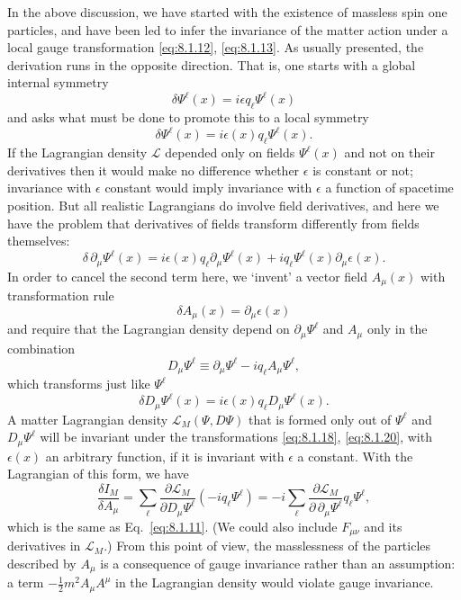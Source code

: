 In the above discussion, we have started with the existence of massless
spin one particles, and have been led to infer the invariance of the matter
action under a local gauge transformation \eqref{eq:8.1.12}, \eqref{eq:8.1.13}. As usually
presented, the derivation runs in the opposite direction. That is, one starts
with a global internal symmetry
\begin{equation}
  \delta\Psi^\ell(x)=i\epsilon q_\ell\Psi^\ell(x)
  \tag{8.1.17}\label{eq:8.1.17}
\end{equation}
and asks what must be done to promote this to a local symmetry
\begin{equation}
  \delta\Psi^\ell(x)=i\epsilon(x)q_\ell\Psi^\ell(x).
  \tag{8.1.18}\label{eq:8.1.18}
\end{equation}
If the Lagrangian density $\mathcal L$ depended only on fields $\Psi^\ell(x)$ and
not on their derivatives then it would make no difference whether $\epsilon$ is
constant or not; invariance with $\epsilon$ constant would imply invariance with
$\epsilon$ a function of spacetime position. But all realistic Lagrangians do
involve field derivatives, and here we have the problem that derivatives of
fields transform differently from fields themselves:
\begin{equation}
  \delta\,\partial_\mu\Psi^\ell(x)
  =i\epsilon(x)q_\ell\partial_\mu\Psi^\ell(x)
  +iq_\ell\Psi^\ell(x)\partial_\mu\epsilon(x).
  \tag{8.1.19}\label{eq:8.1.19}
\end{equation}
In order to cancel the second term here, we `invent' a vector field $A_\mu(x)$
with transformation rule
\begin{equation}
  \delta A_\mu(x)=\partial_\mu\epsilon(x)
  \tag{8.1.20}\label{eq:8.1.20}
\end{equation}
and require that the Lagrangian density depend on $\partial_\mu\Psi^\ell$ and
$A_\mu$ only in the combination
\begin{equation}
  D_\mu\Psi^\ell\equiv\partial_\mu\Psi^\ell-iq_\ell A_\mu\Psi^\ell,
  \tag{8.1.21}\label{eq:8.1.21}
\end{equation}
which transforms just like $\Psi^\ell$
\begin{equation}
  \delta D_\mu\Psi^\ell(x)=i\epsilon(x)q_\ell D_\mu\Psi^\ell(x).
  \tag{8.1.22}\label{eq:8.1.22}
\end{equation}
A matter Lagrangian density $\mathcal L_M(\Psi,D\Psi)$ that is formed only
out of $\Psi^\ell$ and $D_\mu\Psi^\ell$ will be invariant under the
transformations \eqref{eq:8.1.18}, \eqref{eq:8.1.20}, with $\epsilon(x)$ an arbitrary function,
if it is invariant with $\epsilon$ a constant. With the Lagrangian of this form,
we have
\[
  \frac{\delta I_M}{\delta A_\mu}
  =\sum_\ell\frac{\partial\mathcal L_M}{\partial D_\mu\Psi^\ell}
  (-iq_\ell\Psi^\ell)
  =-i\sum_\ell\frac{\partial\mathcal L_M}{\partial\,\partial_\mu\Psi^\ell}
  q_\ell\Psi^\ell,
\]
which is the same as Eq.~\eqref{eq:8.1.11}. (We could also include $F_{\mu\nu}$ and its
derivatives in $\mathcal L_M$.) From this point of view, the masslessness of the
particles described by $A_\mu$ is a consequence of gauge invariance rather
than an assumption: a term $-\tfrac12m^2A_\mu A^\mu$ in the Lagrangian density
would violate gauge invariance.
